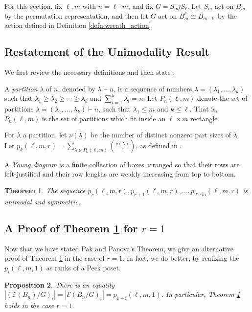 \documentclass[smallextended, envcountsame, numbook]{svjour3}
\theoremstyle{plain}
\newtheorem{thm}{Theorem}[section]
\newtheorem{prop}[thm]{Proposition}
\theoremstyle{definition}
\theoremstyle{remark}
\numberwithin{equation}{section}
\newcommand\ssec{\subsection}
\begin{document}
For this section, fix $\ell,m$ with $n = \ell \cdot m$, and fix $G = S_m \wr S_\ell$. Let $S_m$ act on $B_m$ by the permutation representation, and then let $G$ act on $B_{m}^\ell\cong B_{m \cdot \ell}$ by the action defined in Definition \ref{defn:wreath_action}.

\ssec{Restatement of the Unimodality Result}
We first review the necessary definitions and then state \cite[Theorem 1.1]{pak}:

A {\it partition} $\lambda$ of $n$, denoted by $\lambda \vdash n$, is a sequence of numbers $\lambda = (\lambda_1,\ldots, \lambda_k)$ such that $\lambda_1 \geq \lambda_2 \geq \cdots \geq \lambda_k$ and $\sum_{i=1}^k \lambda_i = n$. Let $P_n(\ell,m)$ denote the set of partitions $\lambda = (\lambda_1,\ldots, \lambda_k) \vdash n$, such that $\lambda_1 \leq m$ and $k \leq \ell$. That is, $P_n(\ell,m)$ is the set of partitions which fit inside an $\ell \times m$ rectangle.

For $\lambda$ a partition, let $\nu(\lambda)$ be the number of distinct nonzero part sizes of $\lambda$.  Let $p_k(\ell,m,r) = \sum_{\lambda \in P_k(\ell,m)} \binom{\nu(\lambda)}{r}$, as defined in \cite[Section 1]{pak}.

A {\it Young diagram} is a finite collection of boxes arranged
so that their rows are left-justified and their row lengths are weakly
increasing from top to bottom.

\begin{thm}
\label{thm:pak_thm}
\cite[Theorem 1.1]{pak}
The sequence $p_r(\ell,m,r), p_{r+1}(\ell,m,r),\ldots, p_{\ell\cdot m}(\ell,m,r)$ is unimodal and symmetric.
\end{thm}

\ssec{A Proof of Theorem \ref{thm:pak_thm} for $r = 1$}
Now that we have stated Pak and Panova's Theorem, we give an alternative proof of Theorem \ref{thm:pak_thm} in the case of $r=1$. In fact, we do better, by realizing the $p_i(\ell,m,1)$ as ranks of a Peck poset.

\begin{prop}
\label{prop:rank_gen_fn_wreath_1}
There is an equality $|(\mathcal E(B_n)/G)_i| = |\mathcal E(B_n/G)_i| = p_{1+i}(\ell,m,1)$. In particular, Theorem \ref{thm:pak_thm} holds in the case $r = 1$.
\end{prop}
\end{document}
